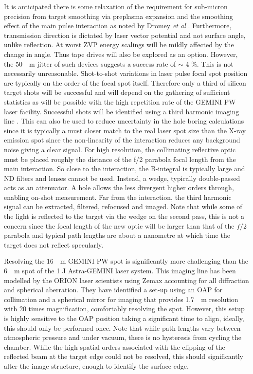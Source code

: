 It is anticipated there is some relaxation of the requirement for sub-micron precision from target smoothing via preplasma expansion and the smoothing effect of the main pulse interaction as noted by Dromey \textit{et al} \cite{dromeyDiffractionlimitedPerformanceFocusing2009}. Furthermore, transmission direction is dictated by laser vector potential and not surface angle, unlike reflection. At worst ZVP energy scalings will be mildly affected by the change in angle. Thus tape drives will also be explored as an option. However, the \qty{50}{\mu m} jitter of such devices suggests a success rate of $\sim$ 4 \%. This is not necessarily unreasonable. Shot-to-shot variations in laser pulse focal spot position are typically on the order of the focal spot itself. Therefore only a third of silicon target shots will be successful and will depend on the gathering of sufficient statistics as will be possible with the high repetition rate of the GEMINI PW laser facility. Successful shots will be identified using a third harmonic imaging line \cite{dromeyThirdHarmonicOrder2009}. This can also be used to reduce uncertainty in the hole boring calculations since it is typically a must closer match to the real laser spot size than the X-ray emission spot since the non-linearity of the interaction reduces any background noise giving a clear signal. For high resolution, the collimating reflective optic must be placed roughly the distance of the f/2 parabola focal length from the main interaction. So close to the interaction, the B-integral is typically large and ND filters and lenses cannot be used. Instead, a wedge, typically double-passed acts as an attenuator. A hole allows the less divergent higher orders through, enabling on-shot measurement. Far from the interaction, the third harmonic signal can be extracted, filtered, refocused and imaged. Note that while some of the light is reflected to the target via the wedge on the second pass, this is not a concern since the focal length of the new optic will be larger than that of the $f/2$ parabola and typical path lengths are about a nanometre at which time the target does not reflect specularly. 

Resolving the \qty{16}{\mu m} GEMINI PW spot is significantly more challenging than the \qty{6}{\mu m} spot of the 1 J Astra-GEMINI laser system. This imaging line has been modelled by the ORION laser scientists using Zemax \cite{AnsysZemaxOpticStudio} accounting for all diffraction and spherical aberration. They have identified a set-up using an \ac{OAP} for collimation and a spherical mirror for imaging that provides \qty{1.7}{\mu m} resolution with 20 times magnification, comfortably resolving the spot. However, this setup is highly sensitive to the \ac{OAP} position taking a significant time to align, ideally, this should only be performed once. Note that while path lengths vary between atmospheric pressure and under vacuum, there is no hysteresis from cycling the chamber. While the high spatial orders associated with the clipping of the reflected beam at the target edge could not be resolved, this should significantly alter the image structure, enough to identify the surface edge. 

